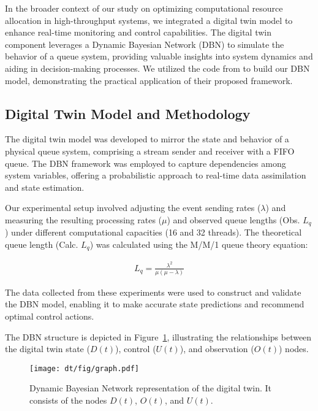 In the broader context of our study on optimizing computational resource allocation in high-throughput systems, we integrated a digital twin model to enhance real-time monitoring and control capabilities. The digital twin component leverages a Dynamic Bayesian Network (DBN) to simulate the behavior of a queue system, providing valuable insights into system dynamics and aiding in decision-making processes. We utilized the code from \cite{kapteyn2021probabilistic} to build our DBN model, demonstrating the practical application of their proposed framework.

\subsection{Digital Twin Model and Methodology}

The digital twin model was developed to mirror the state and behavior of a physical queue system, comprising a stream sender and receiver with a FIFO queue. The DBN framework was employed to capture dependencies among system variables, offering a probabilistic approach to real-time data assimilation and state estimation. 

Our experimental setup involved adjusting the event sending rates (\(\lambda\)) and measuring the resulting processing rates (\(\mu\)) and observed queue lengths (Obs. \(L_q\)) under different computational capacities (16 and 32 threads). The theoretical queue length (Calc. \(L_q\)) was calculated using the M/M/1 queue theory equation:

\begin{align}
L_q = \frac{\lambda^2}{\mu (\mu - \lambda)}
\label{eq:Lq_sec}
\end{align}

The data collected from these experiments were used to construct and validate the DBN model, enabling it to make accurate state predictions and recommend optimal control actions.

The DBN structure is depicted in Figure~\ref{fig:bayesian_network_sec}, illustrating the relationships between the digital twin state (\(D(t)\)), control (\(U(t)\)), and observation (\(O(t)\)) nodes.

\begin{figure}[htbp]
\centering
\texttt{[image: dt/fig/graph.pdf]}
\caption{Dynamic Bayesian Network representation of the digital twin. It consists of the nodes \(D(t)\), \(O(t)\), and \(U(t)\).}
\label{fig:bayesian_network_sec}
\end{figure}

